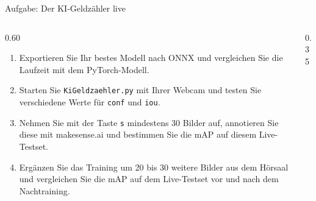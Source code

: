 \begin{frame}{Aufgabe: Der KI-Geldzähler live}
\footnotesize
\begin{columns}
\begin{column}{0.60\textwidth}
\begin{enumerate}
  \item Exportieren Sie Ihr bestes Modell nach ONNX und vergleichen Sie die Laufzeit mit dem PyTorch-Modell.
  \item Starten Sie \texttt{KiGeldzaehler.py} mit Ihrer Webcam und testen Sie verschiedene Werte für \texttt{conf} und \texttt{iou}.
  \item Nehmen Sie mit der Taste \texttt{s} mindestens 30 Bilder auf, annotieren Sie diese mit makesense.ai und bestimmen Sie die mAP auf diesem Live-Testset.
  \item Ergänzen Sie das Training um 20 bis 30 weitere Bilder aus dem Hörsaal und vergleichen Sie die mAP auf dem Live-Testset vor und nach dem Nachtraining.
\end{enumerate}
\end{column}
\begin{column}{0.35\textwidth}
\centering
{}
\end{column}
\end{columns}
\end{frame}

